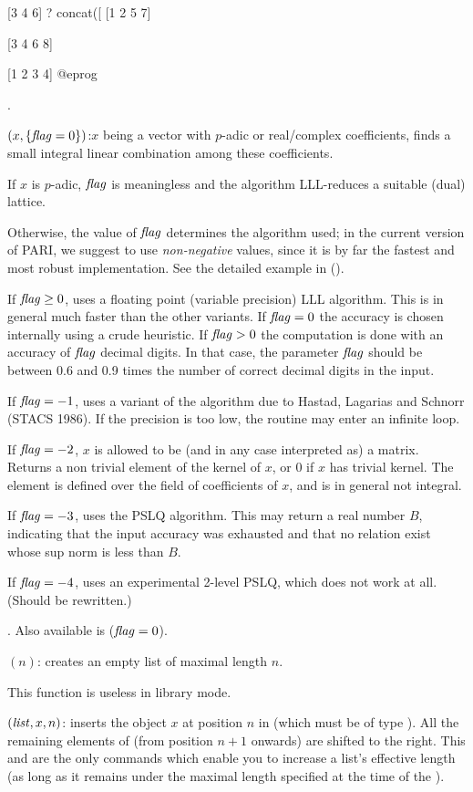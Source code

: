 [3 4 6]
? concat([%
[1 2 5 7]

[3 4 6 8]

[1 2 3 4]
@eprog

.

$(x,\{\hbox{\it f\kern0pt lag\/}=0\})$:$x$ being a
vector with $p$-adic or real/complex coefficients, finds a small integral
linear combination among these coefficients.

If $x$ is $p$-adic, $\hbox{\it f\kern0pt lag\/}$ is meaningless and the algorithm LLL-reduces a
suitable (dual) lattice.

Otherwise, the value of $\hbox{\it f\kern0pt lag\/}$ determines the algorithm used; in the current
version of PARI, we suggest to use \emph{non-negative} values, since it is by
far the fastest and most robust implementation. See the detailed example in
 ().

If $\hbox{\it f\kern0pt lag\/}\geq 0$, uses a floating point (variable precision) LLL algorithm.
This is in general much faster than the other variants. 
If $\hbox{\it f\kern0pt lag\/} = 0$ the accuracy is chosen internally using a crude heuristic.
If $\hbox{\it f\kern0pt lag\/} > 0$ the computation is done with an accuracy of $\hbox{\it f\kern0pt lag\/}$ decimal digits.
In that case, the parameter $\hbox{\it f\kern0pt lag\/}$ should be between 0.6 and 0.9 times the
number of correct decimal digits in the input.

If $\hbox{\it f\kern0pt lag\/}=-1$, uses a variant of the  algorithm due to Hastad,
Lagarias and Schnorr (STACS 1986). If the precision is too low, the routine
may enter an infinite loop.

If $\hbox{\it f\kern0pt lag\/}=-2$, $x$ is allowed to be (and in any case interpreted as) a matrix.
Returns a non trivial element of the kernel of $x$, or $0$ if $x$ has trivial
kernel. The element is defined over the field of coefficients of $x$, and is
in general not integral.

If $\hbox{\it f\kern0pt lag\/}=-3$, uses the PSLQ algorithm. This may return a real number $B$,
indicating that the input accuracy was exhausted and that no relation exist
whose sup norm is less than $B$.

If $\hbox{\it f\kern0pt lag\/}=-4$, uses an experimental 2-level PSLQ, which does not work at all.
(Should be rewritten.)

. Also available is
 ($\hbox{\it f\kern0pt lag\/}=0$).

$(n)$: creates an empty list of maximal length $n$.

This function is useless in library mode.

$(\hbox{\it list\/},x,n)$: inserts the object $x$ at
position $n$ in  (which must be of type ). All the
remaining elements of  (from position $n+1$ onwards) are shifted
to the right. This and  are the only commands which enable
you to increase a list's effective length (as long as it remains under
the maximal length specified at the time of the ).


